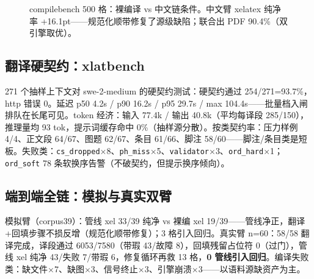 \begin{figure}[htbp]
\centering
{}
\caption{compilebench 500 格：裸编译 vs 中文链条件。中文臂 xelatex 纯净率 +16.1pt——规范化顺带修复了源级缺陷；联合出 PDF 90.4\%（双引擎取优）。}
\label{fig:compile}
\end{figure}

\subsection{翻译硬契约：xlatbench}

271 个抽样上下文对 swe-2-medium 的硬契约测试：硬契约通过 254/271=93.7\%，http 错误 0。延迟 p50 4.2s / p90 16.2s / p95 29.7s / max 104.4s——批量档入闸排队在长尾可见。token 经济：输入 77.4k / 输出 40.8k（平均每译段 285/150），推理量均 93 tok，提示词缓存命中 0\%（抽样源分散）。按类契约率：压力样例 4/4、正文段 64/67、图题 62/67、条目 61/66、脚注 58/60——脚注/条目类是短板。失败类：\texttt{cs\_dropped}$\times$8、\texttt{ph\_miss}$\times$5、\texttt{validator}$\times$3、\texttt{ord\_hard}$\times$1；\texttt{ord\_soft} 78 条软换序告警（不破契约，但提示换序倾向）。

\subsection{端到端全链：模拟与真实双臂}

模拟臂（corpus39）：管线 xel 33/39 纯净 vs 裸编 xel 19/39——管线净正，翻译+回填步骤不损反增（规范化顺带修复）；3 格引入回归。真实臂 n=60：58/58 翻译完成，译段通过 6053/7580（带瑕 43/故障 8），回填残留占位符 0（过门），管线 xel 纯净 43/失败 7/带瑕 6，修复循环再救 13 格，\textbf{0 管线引入回归}。编译失败类：缺文件$\times$7、缺图$\times$3、信号终止$\times$3、引擎崩溃$\times$3——以语料源缺资产为主。

